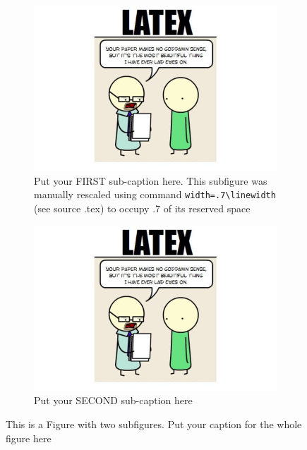 \documentclass[a4paper]{article}
\begin{document}
\begin{figure}[ht]
\begin{subfigure}{.5\textwidth}
  \centering
  \includegraphics[width=.7\linewidth]{./fig-latex.jpg}  %
  \cprotect\caption{Put your FIRST sub-caption here. This subfigure was manually rescaled using command \verb|width=.7\linewidth| (see source .tex) to occupy .7 of its reserved space}
  \label{fig:sub-first-of-two}
\end{subfigure}
\begin{subfigure}{.5\textwidth}
  \centering
  \includegraphics[width=1\linewidth]{./fig-latex.jpg}  
  \caption{Put your SECOND sub-caption here}
  \label{fig:sub-second-of-two}
\end{subfigure}
\caption{This is a Figure with two subfigures. Put your caption for the whole figure here}
\label{fig:fig}
\end{figure}
\end{document}
